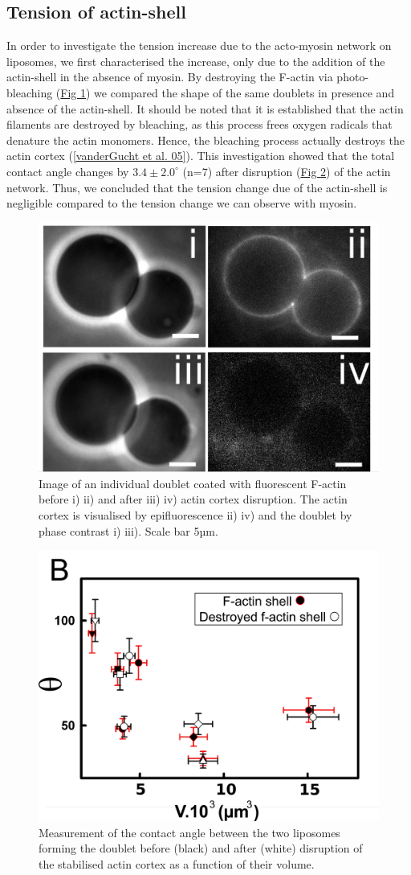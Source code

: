 \documentclass[A4paperpaper,11pt,english]{sphinxmanual}
\begin{document}
\subsection{Tension of actin-shell}
\label{index-latex:tension-of-actin-shell}
In order to investigate the tension increase due to the acto-myosin network
on liposomes, we first characterised the increase, only due to the addition of the actin-shell in
the absence of myosin. By destroying the F-actin via photo-bleaching (\hyperref[index-latex:fig2a]{Fig  \ref*{index-latex:fig2a}}) we compared the shape of the
same doublets in presence and absence of the actin-shell. It should be noted that it is established that the
actin filaments are destroyed by bleaching, as this process frees oxygen radicals that denature the actin monomers. Hence, the bleaching process
actually destroys the actin cortex ({\hyperref[index-latex:vandergucht2005]{{[}vanderGucht et al. 05{]}}}).
This investigation showed that the total contact
angle changes by \(3.4 \pm 2.0 ^{\circ}\) (n=7) after disruption (\hyperref[index-latex:fig2b]{Fig  \ref*{index-latex:fig2b}}) of the actin network.
Thus, we concluded that the tension change due of the actin-shell is negligible
compared to the tension change we can observe with myosin.
\begin{figure}[htbp]
\centering
\capstart

\includegraphics[width=0.500\linewidth]{Fig_02-A.png}
\caption{Image of an individual doublet coated with fluorescent F-actin before i) ii) and
after iii) iv) actin cortex disruption. The actin cortex is visualised by
epifluorescence ii) iv) and the doublet by phase contrast i) iii). Scale
bar 5µm.}\label{index-latex:fig2a}\end{figure}
\begin{figure}[htbp]
\centering
\capstart

\includegraphics[width=0.500\linewidth]{Fig_02-B.png}
\caption{Measurement of the contact angle between the two liposomes forming the
doublet before (black) and after (white) disruption of the stabilised actin
cortex as a function of their volume.}\label{index-latex:fig2b}\end{figure}
\end{document}
